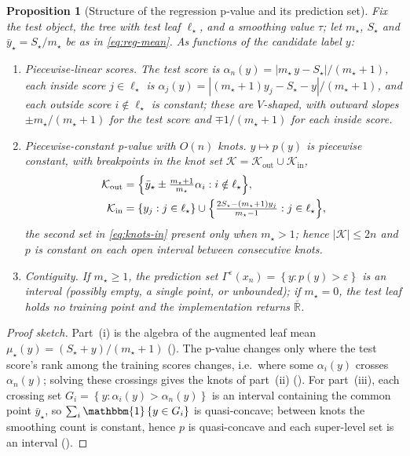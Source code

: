 \documentclass[twoside]{article}
\numberwithin{equation}{section}
\theoremstyle{plain}
\newtheorem{proposition}[theorem]{Proposition}
\theoremstyle{definition}
\theoremstyle{remark}
\newcommand{\set}[1]{\left\{#1\right\}}
\newcommand{\abs}[1]{\left\lvert #1 \right\rvert}
\begin{document}
\begin{proposition}[Structure of the regression p-value and its prediction set]\label{prop:reg-exact}
Fix the test object, the tree with test leaf $\ell_{\star}$, and a smoothing value
$\tau$; let $m_{\star}$, $S_{\star}$ and $\bar{y}_{\star} = S_{\star}/m_{\star}$ be as in
\eqref{eq:reg-mean}. As functions of the candidate label $y$:
\begin{enumerate}[label=\textup{(\roman*)}, leftmargin=*, nosep]
  \item \emph{Piecewise-linear scores.} The test score is
    $\alpha_n(y) = \abs{m_{\star}\,y - S_{\star}}/(m_{\star}+1)$, each inside score
    $j \in \ell_{\star}$ is $\alpha_j(y) = \abs{(m_{\star}+1)y_j - S_{\star} - y}/(m_{\star}+1)$,
    and each outside score $i \notin \ell_{\star}$ is constant; these are $V$-shaped, with
    outward slopes $\pm m_{\star}/(m_{\star}+1)$ for the test score and $\mp 1/(m_{\star}+1)$
    for each inside score.
  \item \emph{Piecewise-constant p-value with $O(n)$ knots.} $y \mapsto p(y)$ is
    piecewise constant, with breakpoints in the knot set
    $\mathcal{K} = \mathcal{K}_{\mathrm{out}} \cup \mathcal{K}_{\mathrm{in}}$,
    \begin{align}
      \mathcal{K}_{\mathrm{out}}
        &= \Bigl\{\bar{y}_{\star} \pm \tfrac{m_{\star}+1}{m_{\star}}\alpha_i
            : i \notin \ell_{\star}\Bigr\}, \label{eq:knots-out}\\
      \mathcal{K}_{\mathrm{in}}
        &= \set{y_j : j \in \ell_{\star}} \cup
           \Bigl\{\tfrac{2S_{\star} - (m_{\star}+1)y_j}{m_{\star}-1}
            : j \in \ell_{\star}\Bigr\}, \label{eq:knots-in}
    \end{align}
    the second set in \eqref{eq:knots-in} present only when $m_{\star} > 1$; hence
    $\abs{\mathcal{K}} \le 2n$ and $p$ is constant on each open interval between
    consecutive knots.
  \item \emph{Contiguity.} If $m_{\star} \ge 1$, the prediction set
    $\Gamma^{\varepsilon}(x_n) = \set{y : p(y) > \varepsilon}$ is an interval (possibly empty, a
    single point, or unbounded); if $m_{\star} = 0$, the test leaf holds no training point
    and the implementation returns $\overline{\mathbb{R}}$.
\end{enumerate}
\end{proposition}

\begin{proof}[Proof sketch]
Part~\textup{(i)} is the algebra of the augmented leaf mean
$\mu_{\star}(y) = (S_{\star}+y)/(m_{\star}+1)$ (). The p-value changes
only where the test score's rank among the training scores changes, i.e.\ where some
$\alpha_i(y)$ crosses $\alpha_n(y)$; solving these crossings gives the knots of
part~\textup{(ii)} (). For part~\textup{(iii)}, each crossing set
$G_i = \set{y : \alpha_i(y) > \alpha_n(y)}$ is an interval containing the common point
$\bar{y}_{\star}$, so $\sum_i \mathbbm{1}\set{y \in G_i}$ is quasi-concave; between knots
the smoothing count is constant, hence $p$ is quasi-concave and each super-level set is an
interval ().
\end{proof}
\end{document}
